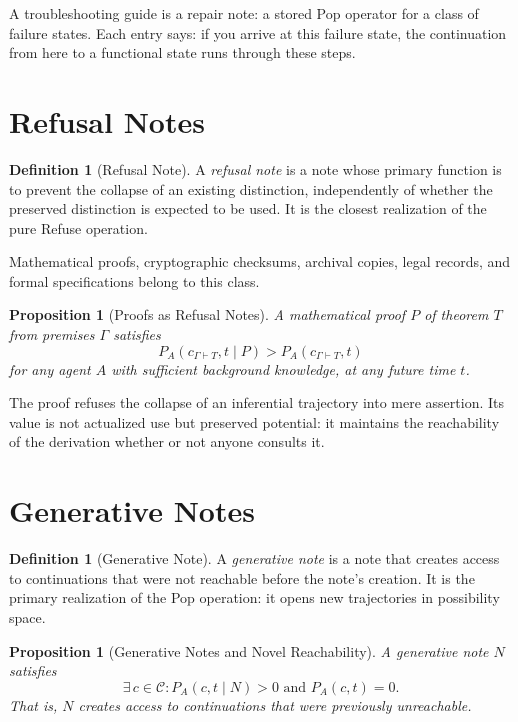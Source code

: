 \documentclass[12pt, a4paper, openany]{book}
\theoremstyle{plain}
\newtheorem{proposition}[theorem]{Proposition}
\theoremstyle{definition}
\newtheorem{definition}[theorem]{Definition}
\theoremstyle{remark}
\newcommand{\calC}{\mathcal{C}}
\begin{document}
A troubleshooting guide is a repair note: a stored Pop operator for a class of
failure states. Each entry says: if you arrive at this failure state, the
continuation from here to a functional state runs through these steps.

\section{Refusal Notes}

\begin{definition}[Refusal Note]
A \emph{refusal note} is a note whose primary function is to prevent the collapse
of an existing distinction, independently of whether the preserved distinction is
expected to be used. It is the closest realization of the pure Refuse operation.
\end{definition}

Mathematical proofs, cryptographic checksums, archival copies, legal records, and
formal specifications belong to this class.

\begin{proposition}[Proofs as Refusal Notes]
A mathematical proof $P$ of theorem $T$ from premises $\Gamma$ satisfies
\[
P_A(c_{\Gamma \vdash T}, t \mid P) > P_A(c_{\Gamma \vdash T}, t)
\]
for any agent $A$ with sufficient background knowledge, at any future time $t$.
\end{proposition}

The proof refuses the collapse of an inferential trajectory into mere assertion.
Its value is not actualized use but preserved potential: it maintains the
reachability of the derivation whether or not anyone consults it.

\section{Generative Notes}

\begin{definition}[Generative Note]
A \emph{generative note} is a note that creates access to continuations that were
not reachable before the note's creation. It is the primary realization of the Pop
operation: it opens new trajectories in possibility space.
\end{definition}

\begin{proposition}[Generative Notes and Novel Reachability]
A generative note $N$ satisfies
\[
\exists\, c \in \calC : P_A(c, t \mid N) > 0 \text{ and } P_A(c, t) = 0.
\]
That is, $N$ creates access to continuations that were previously unreachable.
\end{proposition}
\end{document}
